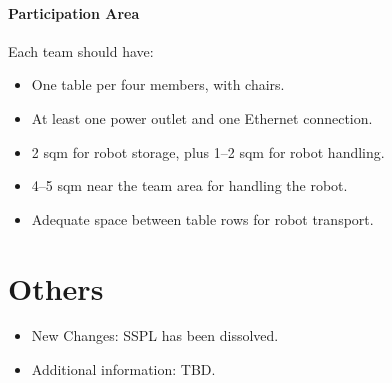 \paragraph{Participation Area} Each team should have:
\begin{itemize}
    \item One table per four members, with chairs.
    \item At least one power outlet and one Ethernet connection.
    \item 2 sqm for robot storage, plus 1--2 sqm for robot handling.
    \item 4--5 sqm near the team area for handling the robot.
    \item Adequate space between table rows for robot transport.
\end{itemize}

\section{Others}
\begin{itemize}
    \item New Changes: SSPL has been dissolved.
    \item Additional information: TBD.
\end{itemize}

